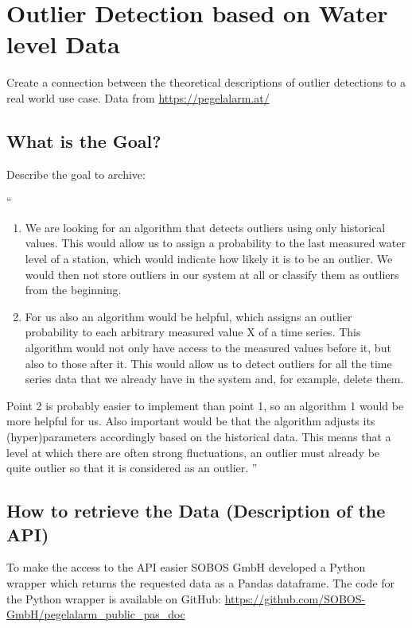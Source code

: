 \chapter{Outlier Detection based on Water level Data}
Create a connection between the theoretical descriptions of outlier detections to a real world use case. Data from \url{https://pegelalarm.at/}
\section{What is the Goal?}
Describe the goal to archive: \newline
{}
\begin{itshape}
    ``
    \begin{enumerate}
        \item We are looking for an algorithm that detects outliers using only historical values. This would allow us to assign a probability to the last measured water level of a station, which would indicate how likely it is to be an outlier. We would then not store outliers in our system at all or classify them as outliers from the beginning.
        \item For us also an algorithm would be helpful, which assigns an outlier probability to each arbitrary measured value X of a time series. This algorithm would not only have access to the measured values before it, but also to those after it. This would allow us to detect outliers for all the time series data that we already have in the system and, for example, delete them.

    \end{enumerate}
    Point 2 is probably easier to implement than point 1, so an algorithm 1 would be more helpful for us.
    Also important would be that the algorithm adjusts its (hyper)parameters accordingly based on the historical data. This means that a level at which there are often strong fluctuations, an outlier must already be quite outlier so that it is considered as an outlier.
    ''
\end{itshape}

\section{How to retrieve the Data (Description of the API)}
To make the access to the API easier SOBOS GmbH developed a Python wrapper which returns the requested data as a Pandas dataframe. The code for the Python wrapper is available on GitHub\cite{GitHub}: \url{https://github.com/SOBOS-GmbH/pegelalarm_public_pas_doc} \cite{strassmayrPegelalarmAPIWrapper2022}

